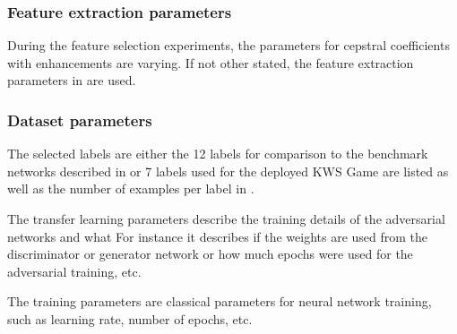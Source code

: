\subsubsection{Feature extraction parameters}
During the feature selection experiments, the parameters for cepstral coefficients with enhancements are varying.
If not other stated, the feature extraction parameters in  are used.


\subsubsection{Dataset parameters}

The selected labels are either the 12 labels for comparison to the benchmark networks described in  or 7 labels used for the deployed KWS Game are listed as well as the number of examples per label in .

The transfer learning parameters describe the training details of the adversarial networks and what
For instance it describes if the weights are used from the discriminator or generator network or how much epochs were used for the adversarial training, etc.
%

The training parameters are classical parameters for neural network training, such as learning rate, number of epochs, etc.
%

